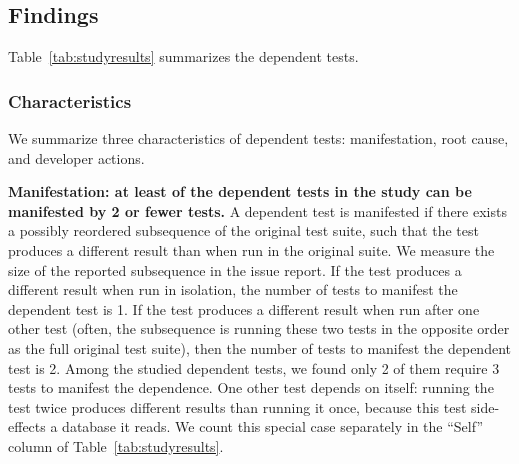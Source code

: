 \subsection{Findings}
\label{sec:studyfindings}

Table~\ref{tab:studyresults} summarizes the dependent tests.


\subsubsection{Characteristics}
\label{sec:characteristics}

We summarize three characteristics of dependent tests:
manifestation, root cause, and developer actions.


\tinyrelax
\noindent \textbf{{Manifestation: at least \dtrate of the dependent
tests in the study can be manifested by 2 or fewer tests.}}
A dependent test is manifested if there exists a possibly reordered
subsequence of the original test suite, such that the test
produces a different
result than when run in the original suite.
We measure the size of the reported subsequence 
in the issue report.
If the test produces a different result when run
in isolation, the number of tests to manifest
the dependent test is 1.
If the test produces a different result
when run after one other test (often, the subsequence is
running these two tests in the opposite order as the full original test
suite), then the number of tests to manifest the dependent test is 2.
Among the \dtnum studied dependent tests, we found only 2 of them
require 3 tests to manifest the dependence.
One other test depends on itself:
running the test twice produces different results than running it once,
because this test side-effects a database it reads.
We count this special case separately in the ``Self'' column
of Table~\ref{tab:studyresults}.

